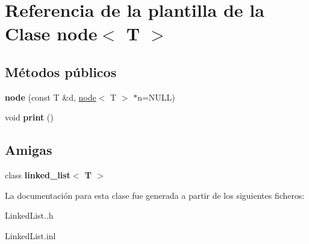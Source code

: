 \hypertarget{classnode}{}\section{Referencia de la plantilla de la Clase node$<$ T $>$}
\label{classnode}
\subsection*{Métodos públicos}
\begin{DoxyCompactItemize}
\item 
\mbox{\label{classnode_a44d030dc708c52ca609a6e6aecc57ee6}} 
{\bfseries node} (const T \&d, \hyperlink{classnode}{node}$<$ T $>$ $\ast$n=N\+U\+LL)
\item 
\mbox{\label{classnode_aa447cbba43b5f6632c43ec8ec342a929}} 
void {\bfseries print} ()
\end{DoxyCompactItemize}
\subsection*{Amigas}
\begin{DoxyCompactItemize}
\item 
\mbox{\label{classnode_a5f1654551132daf4f6b15cd84e15e009}} 
class {\bfseries linked\+\_\+list$<$ T $>$}
\end{DoxyCompactItemize}


La documentación para esta clase fue generada a partir de los siguientes ficheros\+:\begin{DoxyCompactItemize}
\item 
Linked\+List..\+h\item 
Linked\+List.\+inl\end{DoxyCompactItemize}
